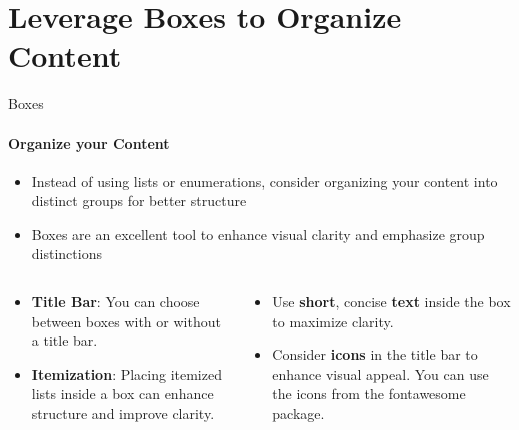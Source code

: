 \documentclass[aspectratio=169]{beamer}
\begin{document}
\section{Leverage \textbf{Boxes} to Organize Content}

\begin{frame}
\end{frame}


\begin{frame}{Boxes}
    \framesubtitle{Organize your Content}
    \begin{coloredblock}[yellow]
        \begin{itemize}
            \item Instead of using lists or enumerations, consider organizing your content into distinct groups for better structure
            \item Boxes are an excellent tool to enhance visual clarity and emphasize group distinctions
        \end{itemize}
    \end{coloredblock}

    \begin{columns}
        \begin{column}{0.49\textwidth}
            \begin{coloredblock}
                \begin{itemize}
                    \item \textbf{Title Bar}: You can choose between boxes with or without a title bar.
                    \item \textbf{Itemization}: Placing itemized lists inside a box can enhance structure and improve clarity.
                \end{itemize}
            \end{coloredblock}
        \end{column}
        \begin{column}{0.49\textwidth}
            \begin{coloredblock}
                \begin{itemize}
                    \item Use \textbf{short}, concise \textbf{text} inside the box to maximize clarity.
                    \item Consider \textbf{icons} in the title bar to enhance visual appeal. You can use the icons from the fontawesome package.
                \end{itemize}
            \end{coloredblock}
        \end{column}
    \end{columns}

\end{frame}
\end{document}

